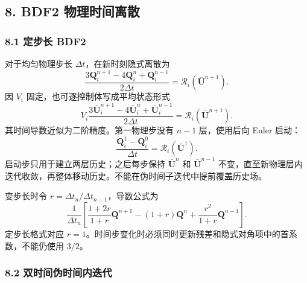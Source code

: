\documentclass[
  12pt,
  UTF8]{ctexart}
\begin{document}
\hypertarget{bdf2-ux7269ux7406ux65f6ux95f4ux79bbux6563}{%
\subsection{8. BDF2
物理时间离散}\label{bdf2-ux7269ux7406ux65f6ux95f4ux79bbux6563}}

\hypertarget{ux5b9aux6b65ux957f-bdf2}{%
\subsubsection{8.1 定步长 BDF2}\label{ux5b9aux6b65ux957f-bdf2}}

对于均匀物理步长 \(\Delta t\)，在新时刻隐式离散为 \begin{equation}
\boxed{
\frac{3\boldsymbol Q_i^{n+1}-4\boldsymbol Q_i^n+
\boldsymbol Q_i^{n-1}}{2\Delta t}
=\boldsymbol{\mathcal R}_i(\bar{\boldsymbol U}^{n+1}).}\end{equation} 因 \(V_i\) 固定，也可逐控制体写成平均状态形式 \begin{equation}
V_i\frac{3\bar{\boldsymbol U}_i^{n+1}-4\bar{\boldsymbol U}_i^n+
\bar{\boldsymbol U}_i^{n-1}}{2\Delta t}
=\boldsymbol{\mathcal R}_i(\bar{\boldsymbol U}^{n+1}).\end{equation} 其时间导数近似为二阶精度。第一物理步没有 \(n-1\) 层，使用后向 Euler
启动： \begin{equation}
\frac{\boldsymbol Q_i^1-\boldsymbol Q_i^0}{\Delta t}
=\boldsymbol{\mathcal R}_i(\bar{\boldsymbol U}^{1}).\end{equation} 启动步只用于建立两层历史；之后每步保持 \(\bar{\boldsymbol U}^n\) 和
\(\bar{\boldsymbol U}^{n-1}\)
不变，直至新物理层内迭代收敛，再整体移动历史。不能在伪时间子迭代中提前覆盖历史场。

变步长时令 \(r=\Delta t_n/\Delta t_{n-1}\)，导数公式为 \begin{equation}
\frac1{\Delta t_n}\left[
\frac{1+2r}{1+r}\boldsymbol Q^{n+1}
-(1+r)\boldsymbol Q^n+\frac{r^2}{1+r}\boldsymbol Q^{n-1}\right].\end{equation} 定步长格式对应
\(r=1\)。时间步变化时必须同时更新残差和隐式对角项中的首系数，不能仍使用
\(3/2\)。

\hypertarget{ux53ccux65f6ux95f4ux4f2aux65f6ux95f4ux5185ux8fedux4ee3}{%
\subsubsection{8.2
双时间伪时间内迭代}\label{ux53ccux65f6ux95f4ux4f2aux65f6ux95f4ux5185ux8fedux4ee3}}
\end{document}
